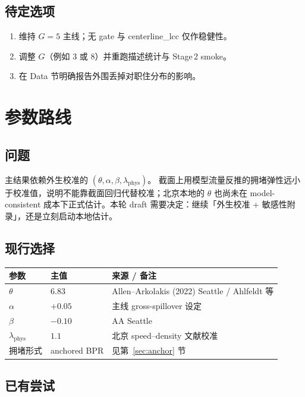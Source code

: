 \documentclass[11pt,a4paper]{article}
\begin{document}
\subsection*{待定选项}
\begin{enumerate}[nosep]
  \item 维持 $G=5$ 主线；无 gate 与 centerline\_lcc 仅作稳健性。
  \item 调整 $G$（例如 $3$ 或 $8$）并重跑描述统计与 Stage\,2 smoke。
  \item 在 Data 节明确报告外围丢掉对职住分布的影响。
\end{enumerate}

\section{参数路线}

\subsection*{问题}
主结果依赖外生校准的 $(\theta,\alpha,\beta,\lambda_{\mathrm{phys}})$。
截面上用模型流量反推的拥堵弹性远小于校准值，说明不能靠截面回归代替校准；北京本地的 $\theta$ 也尚未在 model-consistent 成本下正式估计。本轮 draft 需要决定：继续「外生校准 + 敏感性附录」，还是立刻启动本地估计。

\subsection*{现行选择}
\begin{center}
\begin{tabular}{lll}
\toprule
参数 & 主值 & 来源 / 备注 \\
\midrule
$\theta$ & $6.83$ & Allen--Arkolakis (2022) Seattle / Ahlfeldt 等 \\
$\alpha$ & $+0.05$ & 主线 gross-spillover 设定 \\
$\beta$ & $-0.10$ & AA Seattle \\
$\lambda_{\mathrm{phys}}$ & $1.1$ & 北京 speed--density 文献校准 \\
拥堵形式 & anchored BPR & 见第~\ref{sec:anchor} 节 \\
\bottomrule
\end{tabular}
\end{center}

\subsection*{已有尝试}
\end{document}
